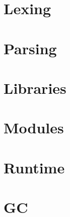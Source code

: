 

\setcounter{tocdepth}{14}





\newpage

\tableofcontents
\listoftodos

\vspace*{1cm}

\newpage

%  



\chapter{Lexing}



\chapter{Parsing}
\label{sec:ocamlyacc}


\chapter{Libraries}
  
  
  
  
  
  
  
  
  
  
  
  
  
  
  
  
  
  
  
  

\chapter{Modules}
  

\chapter{Runtime}
  \label{sec:runtime}
  
  

\chapter{GC}
  \label{sec:gc}
  

